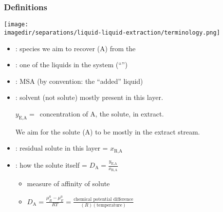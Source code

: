 \begin{frame}\frametitle{Definitions}
	\begin{center}
		\texttt{[image: \\imagedir/separations/liquid-liquid-extraction/terminology.png]}
	\end{center}

	\begin{itemize}
		\item	{\color{purple}{solute}}: species we aim to recover (A) from the {\color{purple}{feed}}
		\item	{\color{purple}{feed or ``feed solvent''}}: one of the liquids in the system {\tiny (``{\color{purple}{carrier}}'')}
		\item	{\color{purple}{solvent}}: MSA (by convention: the ``added'' liquid)
		\item	{\color{purple}{extract}}: solvent (not solute) mostly present in this layer.

				$y_\text{E,A} =$~concentration of A, the solute, in extract.

				We aim for the solute (A) to be mostly in the extract stream.


		\item	{\color{purple}{raffinate}}: residual solute in this layer = $x_\text{R,A}$
		\item	{\color{purple}{distribution}}: how the solute {\color{purple}{partitions}} itself = $D_\text{A} = \displaystyle \frac{y_\text{E,A}}{x_\text{R,A}}$
			\begin{itemize}
				\item	measure of affinity of solute
				\item	$D_\text{A} = \displaystyle \frac{\mu_R^0 - \mu_E^0}{RT} = \displaystyle \frac{\text{chemical potential difference}}{(R)(\text{temperature})}$	%
			\end{itemize}
	\end{itemize}
\end{frame}

